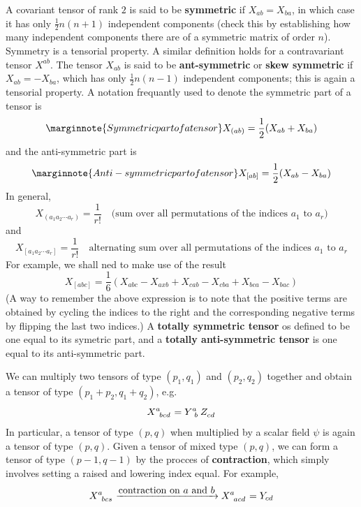 A covariant tensor of rank $2$ is said to be \textbf{symmetric} if $X_{ab}=X_{ba}$, in which case it has only $\frac{1}{2}n(n+1)$ independent components (check this by establishing how many independent components there are of a symmetric matrix of order $n$). Symmetry is a tensorial property. A similar definition holds for a contravariant tensor $X^{ab}$. The tensor $X_{ab}$ is said to be \textbf{ant-symmetric} or \textbf{skew symmetric} if $X_{ab}=-X_{ba}$, which has only $\frac{1}{2}n(n-1)$ independent components; this is again a tensorial property. A notation frequantly used to denote the symmetric part of a tensor is
\begin{equation}\label{5.27}\marginnote{Symmetric part of a tensor}
  X_{(ab)}=\frac{1}{2}(X_{ab}+X_{ba})
\end{equation}
and the anti-symmetric part is
\begin{equation}\label{5.28}\marginnote{Anti-symmetric part of a tensor}
  X_{[ab]}=\frac{1}{2}(X_{ab}-X_{ba})
\end{equation}
In general, 
\begin{equation}
  X_{(a_1a_2\cdots a_r)}=\frac{1}{r!}\quad\mbox{(sum over all permutations of the indices $a_1$ to $a_r$)}
\end{equation}
and
\begin{equation}
  X_{[a_1a_2\cdots a_r]}=\frac{1}{r!}\quad\mbox{alternating sum over all permutations of the indices $a_1$ to $a_r$}
\end{equation}
For example, we shall ned to make use of the result
\begin{equation}\label{5.29}
  X_{[abc]}=\frac{1}{6}(X_{abc}-X_{axb}+X_{cab}-X_{cba}+X_{bca}-X_{bac})
\end{equation}
(A way to remember the above expression is to note that the positive terms are obtained by cycling the indices to the right and the corresponding negative terms by flipping the last two indices.) A \textbf{totally symmetric tensor} os defined to be one equal to its symetric part, and a \textbf{totally anti-symmetric tensor} is one equal to its anti-symmetric part.

We can multiply two tensors of type $(p_1,q_1)$ and $(p_2,q_2)$ together and obtain a tensor of type $(p_1+p_2, q_1+q_2)$, e.g.
\begin{equation}\label{5.30}
  \tensor{X}{^{a}_{bcd}}=\tensor{Y}{^{a}_b}\tensor{Z}{_{cd}}
\end{equation}
In particular, a tensor of type $(p,q)$ when multiplied by a scalar field $\psi$ is again a tensor of type $(p,q)$. Given a tensor of mixed type $(p,q)$, we can form a tensor of type $(p-1,q-1)$ by the procces of \textbf{contraction}, which simply involves setting a raised and lowering index equal. For example,
\begin{equation*}
  \tensor{X}{^{a}_{bcs}}\xrightarrow{\mbox{contraction on $a$ and $b$}}\tensor{X}{^{a}_{acd}}=Y_{cd}
\end{equation*}


